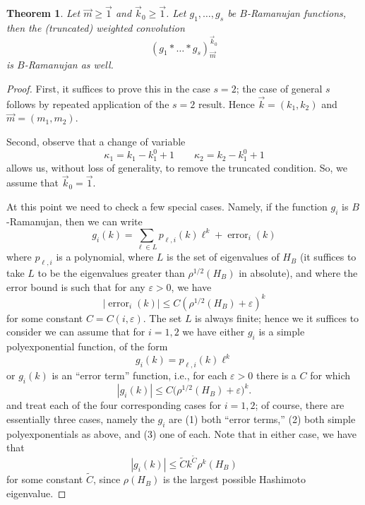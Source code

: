 \documentclass{memo-l}
\theoremstyle{plain}
\theoremstyle{definition}
\numberwithin{section}{chapter}
\numberwithin{equation}{chapter}
\newcommand{\rhoroot}[1]{\rho^{1/2}(H_{#1})}
\DeclareMathOperator{\error}{error}
\theoremstyle{plain}
\newtheorem{thm}[theorem]{Theorem}
\theoremstyle{definition}
\begin{document}
\begin{thm} 
\label{th:weighted-convolution-is-Ramanujan}
Let \( \vec m \geq \vec 1\) and \( \vec{k}_0 \geq \vec 1 \).
Let \( g_1, \ldots, g_s \) be \(B\)-Ramanujan functions, then the
(truncated) weighted convolution \[ (g_1 \ast \ldots \ast g_s)_{\vec
m}^{\vec{k}_0} \] is \( B \)-Ramanujan as well.  \end{thm} 
\begin{proof}
First, it suffices to prove this in the case $s=2$; the case of general
$s$ follows by repeated application of the $s=2$ result.
Hence $\vec k=(k_1,k_2)$ and $\vec m=(m_1,m_2)$.

Second, observe that a change of variable \[ \kappa_1 = k_1 - k_1^0 + 1
\qquad \kappa_2 = k_2 - k_1^0 + 1 \] allows us, without loss of generality,
to remove the truncated condition. So, we assume that \( \vec k_0 = \vec 1
\).

At this point we need to check a few special cases.  Namely,
if the function \(g_i\) is \(B\)-Ramanujan, then we can write \[ g_i(k) =
\sum_{\ell \in L} p_{\ell,i}(k) \ell^k + \error_i(k) \] where \( p_{\ell,i}
\) is a polynomial,
where $L$ is the set of eigenvalues of $H_B$ (it suffices to take $L$ to
be
the eigenvalues greater than $\rhoroot B$ in absolute),
and where the error bound is such that for any \(
\varepsilon > 0\), we have \[ | \error_i(k) | 
\leq C(\rhoroot B +
\varepsilon)^k \] for some constant \( C = C(i, \varepsilon) \). 
The set \(
L \) is always finite; hence we it suffices to consider
we can assume that for $i=1,2$ we have either $g_i$ is a simple
polyexponential function, of the form
\[ g_i(k) = p_{\ell, i}(k) \ell^k 
\]
or $g_i(k)$ is an ``error term'' function,
i.e., for each $\varepsilon>0$ there is
a $C$ for which
\begin{equation}\label{eq:gi_is_error_term}
|g_i(k)| \le C\bigl( \rhoroot B + \varepsilon \bigr)^k .
\end{equation}
and treat each of the four corresponding
cases for \( i = 1,2 \); of course, there are essentially three
cases, namely the $g_i$ are (1) both ``error terms,'' (2) both
simple polyexponentials as above, and (3) one of each.
Note that in either case, we have that \[ | g_i(k)
| \leq \widetilde C k^{\widetilde C} \rho^k(H_B) \] for some constant \(
\widetilde C \), since \(\rho(H_B)\) is the largest possible Hashimoto
eigenvalue.


\end{proof}
\end{document}
